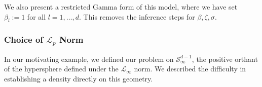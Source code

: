 We also present a restricted Gamma form of this model, where we have set $\beta_l := 1$ for all
  $l = 1,\ldots,d$.  This removes the inference steps for $\beta,\zeta,\sigma$.
  

\subsubsection{Choice of $\mathcal{L}_p$ Norm}
In our motivating example, we defined our problem on $\mathcal{S}_{\infty}^{d-1}$, the positive orthant
  of the hypersphere defined under the $\mathcal{L}_{\infty}$ norm.  We described the difficulty in
  establishing a density directly on this geometry.  






